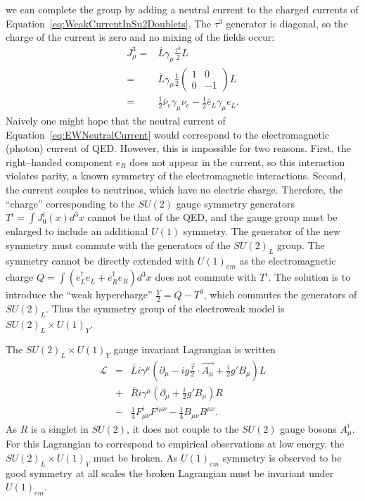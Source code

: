 we can complete the group by adding a neutral current to the charged currents of
Equation~\ref{eq:WeakCurrentInSu2Doublets}.  The $\tau^3$ generator is diagonal,
so the charge of the current is zero and no mixing of the fields occur:
\begin{eqnarray}
  J^3_\mu =& \overline L \gamma_\mu \frac{\tau^3}{2} L \nonumber \\
  =& \overline L \gamma_\mu  \frac{1}{2} 
  \left(\begin{array}{cc} 1 & 0 \\ 0 & -1 \end{array}\right) L \nonumber \\
    =&  \frac{1}{2} \overline \nu_e \gamma_\mu \nu_e - \frac{1}{2} \overline e_L
    \gamma_\mu e_L.
    \label{eq:EWNeutralCurrent}
\end{eqnarray}
Naively one might hope that the neutral current of
Equation~\ref{eq:EWNeutralCurrent} would correspond to the electromagnetic
(photon) current of QED\@.  However, this is impossible for two reasons.  First,
the right--handed component $e_R$ does not appear in the current, so this
interaction violates parity, a known symmetry of the electromagnetic
interactions.  Second, the current couples to neutrinos, which have no electric
charge.   Therefore, the ``charge'' corresponding to the $SU(2)$ gauge symmetry
generators $T^i = \int J_0^i(x)d^3x$ cannot be that of the QED\@, and the gauge
group must be enlarged to include an additional $U(1)$ symmetry.  The generator
of the new symmetry must commute with the generators of the $SU(2)_L$ group.
The symmetry cannot be directly extended with $U(1)_{em}$ as the electromagnetic
charge $Q = \int (e^\dag_L e_L +  e^\dag_R e_R) d^3x$ does not commute with
$T^i$.  The solution is to introduce the ``weak hypercharge'' $\frac{Y}{2} = Q -
T^3$, which commutes the generators of $SU(2)_L$.  Thus the symmetry group of the
electroweak model is $SU(2)_L\times U(1)_Y$.

The $SU(2)_L\times U(1)_Y$ gauge invariant Lagrangian is written 
\begin{eqnarray}
  \mathcal{L} &=& 
  \overline L i \gamma^\mu (\partial_\mu - i g \frac{\vec \tau}{2} \cdot \vec
  {A_\mu} + \frac{i}{2}g'B_\mu)L \nonumber \\
  &+& \overline R i \gamma^\mu (\partial_\mu + \frac{i}{2}g'B_\mu)R \nonumber \\
  &-& \frac{1}{4}F^i_{\mu\nu} F^{i\mu\nu} -\frac{1}{4}B_{\mu\nu} B^{\mu\nu}.  
  \label{eq:FermionAndGaugeLagrangianGWS}
\end{eqnarray}
As $R$ is a singlet in $SU(2)$, it does not couple to the $SU(2)$ gauge bosons
$A^i_\mu$.  For this Lagrangian to correspond to empirical observations at low
energy, the $SU(2)_L \times U(1)_Y$ must be broken.  As $U(1)_{em}$ symmetry 
is observed to be good symmetry at all scales the broken Lagrangian must
be invariant under $U(1)_{em}$.

